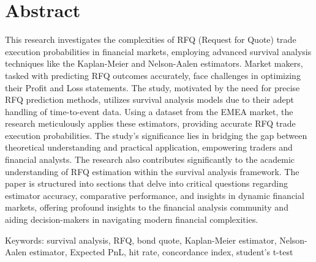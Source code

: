 \chapter*{Abstract}
This research investigates the complexities of RFQ (Request for Quote) trade execution probabilities in financial markets, employing advanced survival analysis techniques like the Kaplan-Meier and Nelson-Aalen estimators. Market makers, tasked with predicting RFQ outcomes accurately, face challenges in optimizing their Profit and Loss statements. The study, motivated by the need for precise RFQ prediction methods, utilizes survival analysis models due to their adept handling of time-to-event data. Using a dataset from the EMEA market, the research meticulously applies these estimators, providing accurate RFQ trade execution probabilities. The study's significance lies in bridging the gap between theoretical understanding and practical application, empowering traders and financial analysts. The research also contributes significantly to the academic understanding of RFQ estimation within the survival analysis framework. The paper is structured into sections that delve into critical questions regarding estimator accuracy, comparative performance, and insights in dynamic financial markets, offering profound insights to the financial analysis community and aiding decision-makers in navigating modern financial complexities.

Keywords: survival analysis, RFQ, bond quote, Kaplan-Meier estimator, Nelson-Aalen estimator, Expected PnL, hit rate, concordance index, student's t-test

